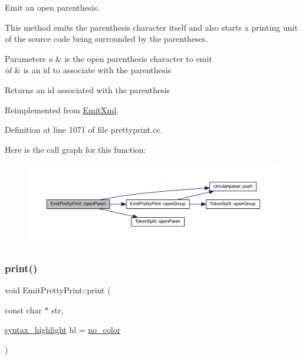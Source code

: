 Emit an open parenthesis. 

This method emits the parenthesis character itself and also starts a printing unit of the source code being surrounded by the parentheses. 
\begin{DoxyParams}{Parameters}
{\em o} & is the open parenthesis character to emit \\
\hline
{\em id} & is an id to associate with the parenthesis \\
\hline
\end{DoxyParams}
\begin{DoxyReturn}{Returns}
an id associated with the parenthesis 
\end{DoxyReturn}


Reimplemented from \mbox{\hyperlink{class_emit_xml_a4f7e781436dde8754ae5f52c9c5edc47}{Emit\+Xml}}.



Definition at line 1071 of file prettyprint.\+cc.

Here is the call graph for this function\+:
\nopagebreak
\begin{figure}[H]
\begin{center}
\leavevmode
\includegraphics[width=350pt]{class_emit_pretty_print_a45992e62b83097eccbd431e1957f2108_cgraph}
\end{center}
\end{figure}
\mbox{\label{class_emit_pretty_print_ac0134af230be5c379fd8173a7e99fac7}} 
\subsubsection{\texorpdfstring{print()}{print()}}
{\footnotesize\ttfamily void Emit\+Pretty\+Print\+::print (\begin{DoxyParamCaption}\item[{const char $\ast$}]{str,  }\item[{\mbox{\hyperlink{class_emit_xml_a7c3577436da429c3c75f4b82cac6864f}{syntax\+\_\+highlight}}}]{hl = {\ttfamily \mbox{\hyperlink{class_emit_xml_a7c3577436da429c3c75f4b82cac6864facf637f33b975ebd31bda638a66d5b052}{no\+\_\+color}}} }\end{DoxyParamCaption})\hspace{0.3cm}{\ttfamily [virtual]}}



